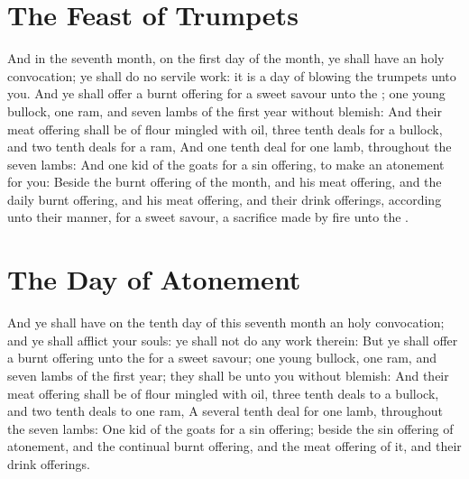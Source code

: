 \section*{The Feast of Trumpets}
\begin{biblechapter} %
\verse And in the seventh month, on the first day of the month, ye shall have an holy convocation; ye shall do no servile work: it is a day of blowing the trumpets unto you.
\verse And ye shall offer a burnt offering for a sweet savour unto the \LORD; one young bullock, one ram, and seven lambs of the first year without blemish:
\verse And their meat offering shall be of flour mingled with oil, three tenth deals for a bullock, and two tenth deals for a ram,
\verse And one tenth deal for one lamb, throughout the seven lambs:
\verse And one kid of the goats for a sin offering, to make an atonement for you:
\verse Beside the burnt offering of the month, and his meat offering, and the daily burnt offering, and his meat offering, and their drink offerings, according unto their manner, for a sweet savour, a sacrifice made by fire unto the \LORD.
\section*{The Day of Atonement}
\verse And ye shall have on the tenth day of this seventh month an holy convocation; and ye shall afflict your souls: ye shall not do any work therein:
\verse But ye shall offer a burnt offering unto the \LORD for a sweet savour; one young bullock, one ram, and seven lambs of the first year; they shall be unto you without blemish:
\verse And their meat offering shall be of flour mingled with oil, three tenth deals to a bullock, and two tenth deals to one ram,
\verse A several tenth deal for one lamb, throughout the seven lambs:
\verse One kid of the goats for a sin offering; beside the sin offering of atonement, and the continual burnt offering, and the meat offering of it, and their drink offerings.

\end{biblechapter}
